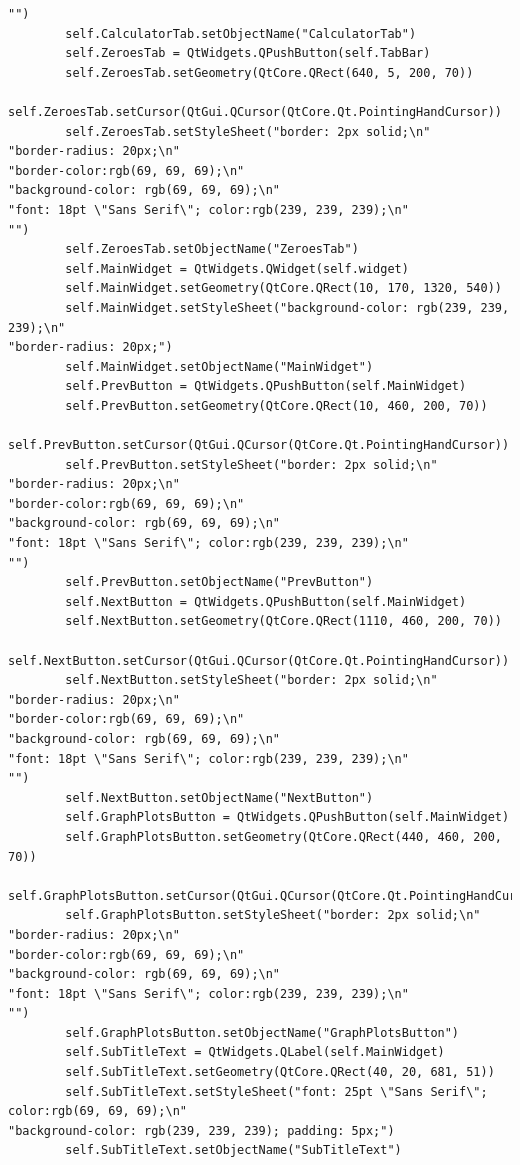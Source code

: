 \documentclass{article}
\begin{document}
\begin{lstlisting}
"")
        self.CalculatorTab.setObjectName("CalculatorTab")
        self.ZeroesTab = QtWidgets.QPushButton(self.TabBar)
        self.ZeroesTab.setGeometry(QtCore.QRect(640, 5, 200, 70))
        self.ZeroesTab.setCursor(QtGui.QCursor(QtCore.Qt.PointingHandCursor))
        self.ZeroesTab.setStyleSheet("border: 2px solid;\n"
"border-radius: 20px;\n"
"border-color:rgb(69, 69, 69);\n"
"background-color: rgb(69, 69, 69);\n"
"font: 18pt \"Sans Serif\"; color:rgb(239, 239, 239);\n"
"")
        self.ZeroesTab.setObjectName("ZeroesTab")
        self.MainWidget = QtWidgets.QWidget(self.widget)
        self.MainWidget.setGeometry(QtCore.QRect(10, 170, 1320, 540))
        self.MainWidget.setStyleSheet("background-color: rgb(239, 239, 239);\n"
"border-radius: 20px;")
        self.MainWidget.setObjectName("MainWidget")
        self.PrevButton = QtWidgets.QPushButton(self.MainWidget)
        self.PrevButton.setGeometry(QtCore.QRect(10, 460, 200, 70))
        self.PrevButton.setCursor(QtGui.QCursor(QtCore.Qt.PointingHandCursor))
        self.PrevButton.setStyleSheet("border: 2px solid;\n"
"border-radius: 20px;\n"
"border-color:rgb(69, 69, 69);\n"
"background-color: rgb(69, 69, 69);\n"
"font: 18pt \"Sans Serif\"; color:rgb(239, 239, 239);\n"
"")
        self.PrevButton.setObjectName("PrevButton")
        self.NextButton = QtWidgets.QPushButton(self.MainWidget)
        self.NextButton.setGeometry(QtCore.QRect(1110, 460, 200, 70))
        self.NextButton.setCursor(QtGui.QCursor(QtCore.Qt.PointingHandCursor))
        self.NextButton.setStyleSheet("border: 2px solid;\n"
"border-radius: 20px;\n"
"border-color:rgb(69, 69, 69);\n"
"background-color: rgb(69, 69, 69);\n"
"font: 18pt \"Sans Serif\"; color:rgb(239, 239, 239);\n"
"")
        self.NextButton.setObjectName("NextButton")
        self.GraphPlotsButton = QtWidgets.QPushButton(self.MainWidget)
        self.GraphPlotsButton.setGeometry(QtCore.QRect(440, 460, 200, 70))
        self.GraphPlotsButton.setCursor(QtGui.QCursor(QtCore.Qt.PointingHandCursor))
        self.GraphPlotsButton.setStyleSheet("border: 2px solid;\n"
"border-radius: 20px;\n"
"border-color:rgb(69, 69, 69);\n"
"background-color: rgb(69, 69, 69);\n"
"font: 18pt \"Sans Serif\"; color:rgb(239, 239, 239);\n"
"")
        self.GraphPlotsButton.setObjectName("GraphPlotsButton")
        self.SubTitleText = QtWidgets.QLabel(self.MainWidget)
        self.SubTitleText.setGeometry(QtCore.QRect(40, 20, 681, 51))
        self.SubTitleText.setStyleSheet("font: 25pt \"Sans Serif\"; color:rgb(69, 69, 69);\n"
"background-color: rgb(239, 239, 239); padding: 5px;")
        self.SubTitleText.setObjectName("SubTitleText")

\end{lstlisting}
\end{document}
